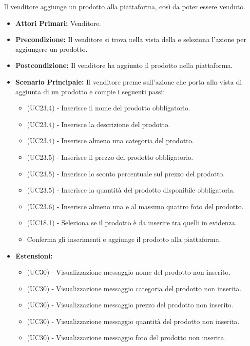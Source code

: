 Il venditore aggiunge un prodotto alla piattaforma, così da poter essere venduto.
\begin{itemize}
    \item \textbf{Attori Primari:} Venditore.
    \item \textbf{Precondizione:} Il venditore si trova nella vista della  e seleziona l'azione per aggiungere un prodotto.
    \item \textbf{Postcondizione:} Il venditore ha aggiunto il prodotto nella piattaforma.
    \item \textbf{Scenario Principale:} Il venditore preme sull'azione che porta alla vista di aggiunta di un prodotto e compie i seguenti passi:
    \begin{itemize}
        \item (UC23.4) - Inserisce il nome del prodotto obbligatorio.
        \item (UC23.4) - Inserisce la descrizione del prodotto.
        \item (UC23.4) - Inserisce almeno una categoria del prodotto.
        \item (UC23.5) - Inserisce il prezzo del prodotto obbligatorio.
        \item (UC23.5) - Inserisce lo sconto percentuale sul prezzo del prodotto.
        \item (UC23.5) - Inserisce la quantità del prodotto disponibile obbligatoria.
        \item (UC23.6) - Inserisce almeno una e al massimo quattro foto del prodotto.
        \item (UC18.1) - Seleziona se il prodotto è da inserire tra quelli in evidenza.
        \item Conferma gli inserimenti e aggiunge il prodotto alla piattaforma.
    \end{itemize}
    \item \textbf{Estensioni:}
    \begin{itemize}
        \item (UC30) - Visualizzazione messaggio nome del prodotto non inserito.
        \item (UC30) - Visualizzazione messaggio categoria del prodotto non inserita.
        \item (UC30) - Visualizzazione messaggio prezzo del prodotto non inserito.
        \item (UC30) - Visualizzazione messaggio quantità del prodotto non inserita.
        \item (UC30) - Visualizzazione messaggio foto del prodotto non inserita.
    \end{itemize}
\end{itemize}

